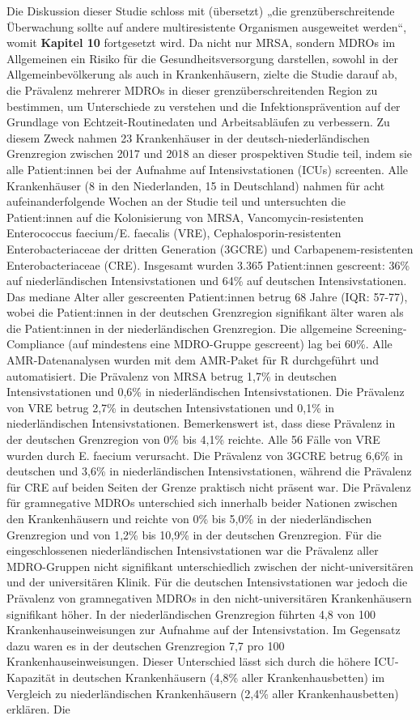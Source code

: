 \documentclass[
]{book}
\begin{document}
Die Diskussion dieser Studie schloss mit (übersetzt) „die grenzüberschreitende Überwachung sollte auf andere multiresistente Organismen ausgeweitet werden``, womit \textbf{Kapitel 10} fortgesetzt wird. Da nicht nur MRSA, sondern MDROs im Allgemeinen ein Risiko für die Gesundheitsversorgung darstellen, sowohl in der Allgemeinbevölkerung als auch in Krankenhäusern, zielte die Studie darauf ab, die Prävalenz mehrerer MDROs in dieser grenzüberschreitenden Region zu bestimmen, um Unterschiede zu verstehen und die Infektionsprävention auf der Grundlage von Echtzeit-Routinedaten und Arbeitsabläufen zu verbessern. Zu diesem Zweck nahmen 23 Krankenhäuser in der deutsch-niederländischen Grenzregion zwischen 2017 und 2018 an dieser prospektiven Studie teil, indem sie alle Patient:innen bei der Aufnahme auf Intensivstationen (ICUs) screenten. Alle Krankenhäuser (8 in den Niederlanden, 15 in Deutschland) nahmen für acht aufeinanderfolgende Wochen an der Studie teil und untersuchten die Patient:innen auf die Kolonisierung von MRSA, Vancomycin-resistenten Enterococcus faecium/E. faecalis (VRE), Cephalosporin-resistenten Enterobacteriaceae der dritten Generation (3GCRE) und Carbapenem-resistenten Enterobacteriaceae (CRE). Insgesamt wurden 3.365 Patient:innen gescreent: 36\% auf niederländischen Intensivstationen und 64\% auf deutschen Intensivstationen. Das mediane Alter aller gescreenten Patient:innen betrug 68 Jahre (IQR: 57-77), wobei die Patient:innen in der deutschen Grenzregion signifikant älter waren als die Patient:innen in der niederländischen Grenzregion. Die allgemeine Screening-Compliance (auf mindestens eine MDRO-Gruppe gescreent) lag bei 60\%. Alle AMR-Datenanalysen wurden mit dem AMR-Paket für R durchgeführt und automatisiert. Die Prävalenz von MRSA betrug 1,7\% in deutschen Intensivstationen und 0,6\% in niederländischen Intensivstationen. Die Prävalenz von VRE betrug 2,7\% in deutschen Intensivstationen und 0,1\% in niederländischen Intensivstationen. Bemerkenswert ist, dass diese Prävalenz in der deutschen Grenzregion von 0\% bis 4,1\% reichte. Alle 56 Fälle von VRE wurden durch E. faecium verursacht. Die Prävalenz von 3GCRE betrug 6,6\% in deutschen und 3,6\% in niederländischen Intensivstationen, während die Prävalenz für CRE auf beiden Seiten der Grenze praktisch nicht präsent war. Die Prävalenz für gramnegative MDROs unterschied sich innerhalb beider Nationen zwischen den Krankenhäusern und reichte von 0\% bis 5,0\% in der niederländischen Grenzregion und von 1,2\% bis 10,9\% in der deutschen Grenzregion. Für die eingeschlossenen niederländischen Intensivstationen war die Prävalenz aller MDRO-Gruppen nicht signifikant unterschiedlich zwischen der nicht-universitären und der universitären Klinik. Für die deutschen Intensivstationen war jedoch die Prävalenz von gramnegativen MDROs in den nicht-universitären Krankenhäusern signifikant höher. In der niederländischen Grenzregion führten 4,8 von 100 Krankenhauseinweisungen zur Aufnahme auf der Intensivstation. Im Gegensatz dazu waren es in der deutschen Grenzregion 7,7 pro 100 Krankenhauseinweisungen. Dieser Unterschied lässt sich durch die höhere ICU-Kapazität in deutschen Krankenhäusern (4,8\% aller Krankenhausbetten) im Vergleich zu niederländischen Krankenhäusern (2,4\% aller Krankenhausbetten) erklären. Die 
\end{document}
